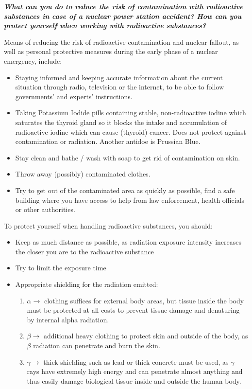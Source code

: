 \pagebreak

\textbf{\emph{What can you do to reduce the risk of contamination with radioactive substances in case of a nuclear power station accident? How can you protect yourself when working with radioactive substances?}}

Means of reducing the risk of radioactive contamination and nuclear fallout, as well as personal protective measures during the early phase of a nuclear emergency, include:

\begin{itemize}
	\item Staying informed and keeping accurate information about the current situation through radio, television or the internet, to be able to follow governments' and experts' instructions.
	\item Taking Potassium Iodide pills containing stable, non-radioactive iodine which saturates the thyroid gland so it blocks the intake and accumulation of radioactive iodine which can cause (thyroid) cancer. Does not protect against contamination or radiation. Another antidoe is Prussian Blue.
	\item Stay clean and bathe / wash with soap to get rid of contamination on skin. 
	\item Throw away (possibly) contaminated clothes.
	\item Try to get out of the contaminated area as quickly as possible, find a safe building where you have access to help from law enforcement, health officials or other authorities.
\end{itemize}

To protect yourself when handling radioactive substances, you should:

\begin{itemize}
	\item Keep as much distance as possible, as radiation exposure intensity increases the closer you are to the radioactive substance
	\item Try to limit the exposure time
	\item Appropriate shielding for the radiation emitted:
		\begin{enumerate}
			\item $\alpha \rightarrow$ clothing suffices for external body areas, but tissue inside the body must be protected at all costs to prevent tissue damage and denaturing by internal alpha radiation.
			\item $\beta \rightarrow$ additional heavy clothing to protect skin and outside of the body, as $\beta$ radiation can penetrate and burn the skin.
			\item $\gamma \rightarrow$ thick shielding such as lead or thick concrete must be used, as $\gamma$ rays have extremely high energy and can penetrate almost anything and thus easily damage biological tissue inside and outside the human body.
		\end{enumerate}
\end{itemize}

